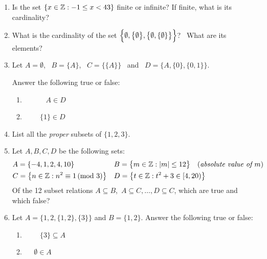 \begin{exercises}{}{}
\begin{enumerate}
			
		\item Is the set $\{x\in\mathbb{Z}:-1\le x<43\}$ finite or infinite? If finite, what is its cardinality?
				
		
			
			
		\item What is the cardinality of the set $\Bigl\{\emptyset,\bigl\{\emptyset\bigr\},\bigl\{\emptyset,\{\emptyset\}\bigr\}\Bigr\}$? \ What are its elements?
		
		\item Let $A=\emptyset$, \ $B=\{A\}$, \ $C=\bigl\{\{A\}\bigr\}$ \ and \ $D=\bigl\{A,\{0\},\{0,1\}\bigr\}$.\par
	  Answer the following true or false:
	  \begin{enumerate}
	    \item {} \  \  \  \ $A\in D$
	    \setcounter{enumii}{5}
	    \item {} \  \  \ $\{1\}\in D$
	  \end{enumerate}
	  
	  
	  \item List all the \emph{proper} subsets of $\{1,2,3\}$.
	  
	    
		\goodbreak
	   
		   
		\item Let $A,B,C,D$ be the following sets:
	  \begin{align*}
	  	&A=\{-4,1,2,4,10\}
	  	&&B=\bigl\{m\in\mathbb{Z}:\left| m\right|\le 12\bigr\}\quad \text{(\emph{absolute value of $m$})}\\
	  	&C=\bigl\{n\in\mathbb{Z}:n^2\equiv 1\negthickspace\pmod{3}\bigr\}
	  	&&D=\bigl\{t\in\mathbb{Z}:t^2+3\in [4,20)\bigr\}  
	  \end{align*}
	  Of the 12 subset relations $A\subseteq B$,\ $A\subseteq C,\ldots, D\subseteq C$, which are true and which false?
	  
	  \item Let $A=\bigl\{1,2,\{1,2\},\{3\}\bigr\}$ and $B=\{1,2\}$. Answer the following true or false:
	  \begin{enumerate}
	    \item {} \  \  \ $\{3\}\subseteq A$
	    \setcounter{enumii}{4}
	    \item {} \  \ $\emptyset\in A$
	  \end{enumerate}
	  

\end{enumerate}
\end{exercises}
